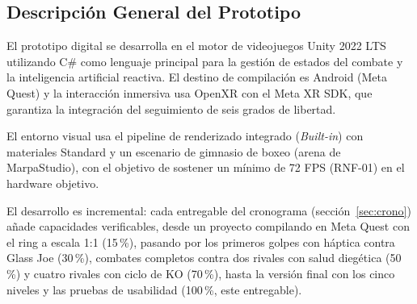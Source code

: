 \subsection{Descripción General del Prototipo}
El prototipo digital se desarrolla en el motor de videojuegos Unity 2022 LTS utilizando C\# como lenguaje principal para la gestión de estados del combate y la inteligencia artificial reactiva. El destino de compilación es Android (Meta Quest) y la interacción inmersiva usa OpenXR con el Meta XR SDK, que garantiza la integración del seguimiento de seis grados de libertad.

El entorno visual usa el pipeline de renderizado integrado (\emph{Built-in}) con materiales Standard y un escenario de gimnasio de boxeo (arena de MarpaStudio), con el objetivo de sostener un mínimo de 72 FPS (RNF-01) en el hardware objetivo.

El desarrollo es incremental: cada entregable del cronograma (sección~\ref{sec:crono}) añade capacidades verificables, desde un proyecto compilando en Meta Quest con el ring a escala 1:1 (15\,\%), pasando por los primeros golpes con háptica contra Glass Joe (30\,\%), combates completos contra dos rivales con salud diegética (50\,\%) y cuatro rivales con ciclo de KO (70\,\%), hasta la versión final con los cinco niveles y las pruebas de usabilidad (100\,\%, este entregable).
